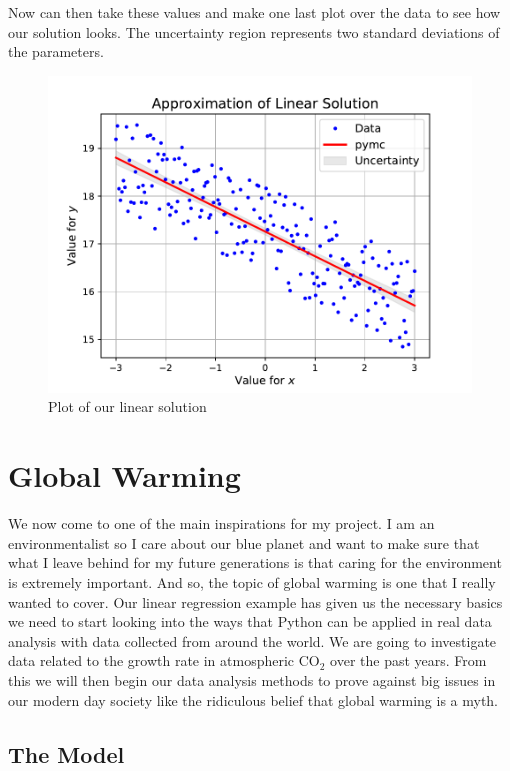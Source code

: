 \documentclass[12pt,twoside]{report}   %
\begin{document}
Now can then take these values and make one last plot over the data to see how our solution looks. The uncertainty region represents two standard deviations of the parameters.
\begin{figure}[H]
\centering
\includegraphics[width = 5in]{Finalgraph.pdf}
\caption{Plot of our linear solution}
\label{figFinalGraph1}
\end{figure}

\chapter{Global Warming}\label{Global Warming}

We now come to one of the main inspirations for my project. I am an environmentalist so I care about our blue planet and want to make sure that what I leave behind for my future generations is that caring for the environment is extremely important. And so, the topic of global warming is one that I really wanted to cover. Our linear regression example has given us the necessary basics we need to start looking into the ways that Python can be applied in real data analysis with data collected from around the world. We are going to investigate data related to the growth rate in atmospheric $\mathrm{CO_2}$ over the past years. From this we will then begin our data analysis methods to prove against big issues in our modern day society like the ridiculous belief that global warming is a myth.

\section{The Model}\label{The Model3}
\end{document}

